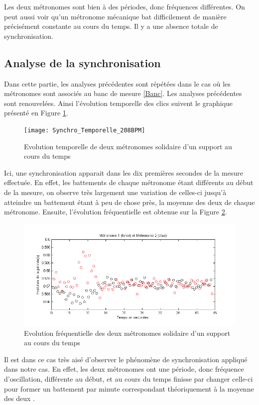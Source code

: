 \documentclass[a4paper,11pt]{report}
\begin{document}
Les deux métronomes sont bien à des périodes, donc fréquences différentes. On peut aussi voir qu'un métronome mécanique bat difficilement de manière précisément constante au cours du temps. Il y a une absence totale de synchronisation.

\subsection{Analyse de la synchronisation}
Dans cette partie, les analyses précédentes sont répétées dans le cas où les métronomes sont associés au banc de mesure \ref{Banc}. Les analyses précédentes sont renouvelées. Ainsi l'évolution temporelle des clics suivent le graphique présenté en Figure \ref{SynchronisationT}.
\begin{figure}[h]
\centering
\texttt{[image: Synchro\_Temporelle\_208BPM]}
\caption{Evolution temporelle de deux métronomes solidaire d'un support au cours du temps}\label{SynchronisationT}
\end{figure}
Ici, une synchronisation apparait dans les dix premières secondes de la mesure effectuée. En effet, les battements de chaque métronome étant différents au début de la mesure, on observe très largement une variation de celles-ci jusqu'à atteindre un battement étant à peu de chose près, la moyenne des deux de chaque métronome. Ensuite, l'évolution fréquentielle est obtenue sur la Figure \ref{SynchronisationF}.
\begin{figure}[!h]
\centering
\includegraphics[width=1\textwidth]{Synchro_Frequence_208BPM}
\caption{Evolution fréquentielle des deux métronomes solidaire d'un support au cours du temps}\label{SynchronisationF}
\end{figure}
Il est dans ce cas très aisé d'observer le phénomène de synchronisation appliqué dans notre cas. En effet, les deux métronomes ont une période, donc fréquence d'oscillation, différente au début, et au cours du temps finisse par changer celle-ci pour former un battement par minute correspondant théoriquement à la moyenne des deux \cite{piko}.
\end{document}
